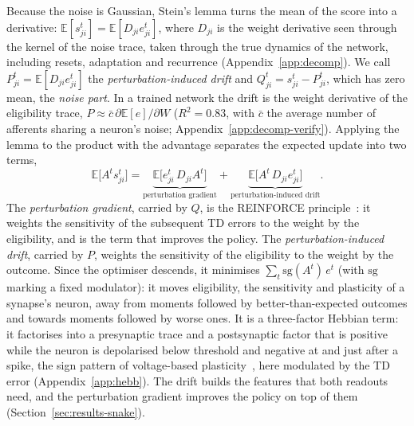 \documentclass[10pt,twocolumn]{article}
\begin{document}
Because the noise is Gaussian, Stein's lemma turns the mean of the score into a
derivative: $\mathbb{E}[s^t_{ji}]=\mathbb{E}[D_{ji}e^t_{ji}]$, where $D_{ji}$ is
the weight derivative seen through the kernel of the noise trace, taken through the
true dynamics of the network, including resets, adaptation and recurrence
(Appendix~\ref{app:decomp}). We call
$P^t_{ji}=\mathbb{E}[D_{ji}e^t_{ji}]$ the \emph{perturbation-induced drift} and
$Q^t_{ji}=s^t_{ji}-P^t_{ji}$, which has zero mean, the \emph{noise part}. In a
trained network the drift is the weight derivative of the eligibility trace,
$P\approx\bar c\,\partial\mathbb{E}[e]/\partial W$ ($R^2=0.83$, with $\bar c$ the
average number of afferents sharing a neuron's noise;
Appendix~\ref{app:decomp-verify}). Applying the lemma to the product with the
advantage separates the expected update into two terms,
\begin{equation}
\mathbb{E}\big[A^t s^t_{ji}\big]=
\underbrace{\mathbb{E}\big[e^t_{ji}\,D_{ji}A^t\big]}_{\text{perturbation gradient}}
+\underbrace{\mathbb{E}\big[A^t\,D_{ji}e^t_{ji}\big]}_{\text{perturbation-induced drift}} .
\label{eq:two-terms}
\end{equation}
The \emph{perturbation gradient}, carried by $Q$, is the REINFORCE
principle~\citep{Williams1992REINFORCE}: it weights the sensitivity of the
subsequent TD errors to the weight by the eligibility, and is the term that
improves the policy. The \emph{perturbation-induced drift}, carried by $P$, weights
the sensitivity of the eligibility to the weight by the outcome. Since the
optimiser descends, it minimises $\sum_t\mathrm{sg}(A^t)\,e^t$ (with
$\mathrm{sg}$ marking a fixed modulator): it moves eligibility, the sensitivity
and plasticity of a synapse's neuron, away from moments followed by better-than-expected
outcomes and towards moments followed by worse ones. It is a three-factor Hebbian
term: it factorises into a presynaptic trace and a postsynaptic factor that is
positive while the neuron is depolarised below threshold and negative at and just
after a spike, the sign pattern of voltage-based plasticity~\citep{Clopath2010Voltage},
here modulated by the TD error (Appendix~\ref{app:hebb}). The drift builds the
features that both readouts need, and the perturbation gradient improves the
policy on top of them (Section~\ref{sec:results-snake}).
\end{document}
